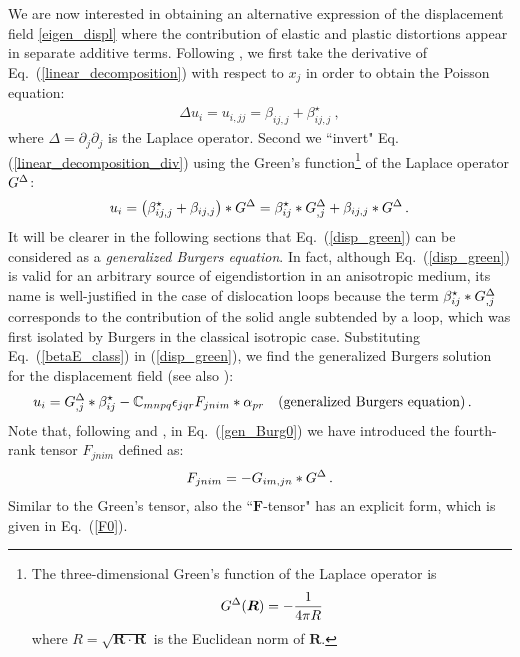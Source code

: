 We are now interested in obtaining an alternative expression of the displacement field \eqref{eigen_displ} where the contribution of elastic and plastic distortions appear in separate additive terms. Following  \citep{Lazar:2013jb},  we first take the derivative of Eq.~(\ref{linear_decomposition}) with respect to $x_j$ in order to obtain the Poisson equation:
\begin{align}
\Delta u_i=u_{i,jj}=\beta_{ij,j}+\beta^\star_{ij,j}\ ,
\label{linear_decomposition_div}
\end{align}
where $\Delta=\partial_j\partial_j$ is the Laplace operator. Second we ``invert" Eq. (\ref{linear_decomposition_div}) using the Green's  function\footnote{The three-dimensional Green's  function of the  Laplace operator is~\citep{Wl}
\begin{align}
G^\Delta(\bm R)=-\frac{1}{4\pi R}
\label{Green_Poiss}
\end{align}
where $R=\sqrt{\bm R\cdot\bm R}$ is the Euclidean norm of $\bm R$.
} of the Laplace operator $G^\Delta$: 
\begin{align}
u_{i}=\left(\beta^\star_{ij,j}+\beta_{ij,j}\right)*G^\Delta = \beta^\star_{ij}*G^\Delta_{,j}+\beta_{ij,j}*G^\Delta\, .
\label{disp_green}
\end{align}
It will be clearer in the following sections that Eq.~(\ref{disp_green}) can be considered as a \textit{generalized Burgers equation}. In fact, although Eq.~(\ref{disp_green}) is valid for an arbitrary source of  eigendistortion in an anisotropic medium, its name is well-justified in the case of dislocation loops because the term $ \beta^\star_{ij}*G^\Delta_{,j}$ corresponds to the contribution of the solid angle subtended by a loop, which was first isolated by Burgers \citep{Burgers:1939ui,Burgers:1939vn} in the classical isotropic case. Substituting Eq.~(\ref{betaE_class}) in (\ref{disp_green}), we find the
generalized Burgers solution for the displacement field (see also \citet{Lazar:2013jb}):
\begin{align}
u_i
&=G^\Delta_{,j}*\beta^\star_{ij}-\mathbb{C}_{mnpq}\epsilon_{jqr}F_{jnim}*\alpha_{pr}  && \text{(generalized Burgers equation)}\,.
\label{gen_Burg0}
\end{align}
Note that, following \citet{Kirchner:1983} and \citet{Lazar:2013jb}, in Eq.~(\ref{gen_Burg0}) we have introduced the fourth-rank tensor $F_{jnim}$ defined as:
\begin{align}
F_{jnim}=-G_{im,jn}*G^\Delta \,.
\label{F_classical}
\end{align}
Similar to the Green's  tensor, also the ``$\bm F$-tensor" has an explicit form, which is given in Eq.~(\ref{F0}). 
%

